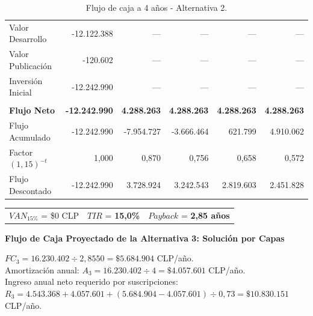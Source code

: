 \begin{table}[h!]
\begin{tabular}{|m{3.2cm}|r|r|r|r|r|}
        & & & & & \\ \hline
        Valor Desarrollo & -12.122.388 & --- & --- & --- & --- \\ \hline
        Valor Publicación & -120.602 & --- & --- & --- & --- \\ \hline
        \rowcolor[HTML]{F3E5F5} 
        Inversión Inicial & -12.242.990 & --- & --- & --- & --- \\ \hline
        & & & & & \\ \hline
        \rowcolor[HTML]{E8F5E9}
        \textbf{Flujo Neto} & \textbf{-12.242.990} & \textbf{4.288.263} & \textbf{4.288.263} & \textbf{4.288.263} & \textbf{4.288.263} \\ \hline
        Flujo Acumulado & -12.242.990 & -7.954.727 & -3.666.464 & 621.799 & 4.910.062 \\ \hline
        \rowcolor[HTML]{F3E5F5}
        Factor $(1{,}15)^{-t}$ & 1,000 & 0,870 & 0,756 & 0,658 & 0,572 \\ \hline
        \rowcolor[HTML]{F3E5F5}
        Flujo Descontado & -12.242.990 & 3.728.924 & 3.242.543 & 2.819.603 & 2.451.828 \\ \hline
    \end{tabular}
    \caption{Flujo de caja a 4 años - Alternativa 2.}
    \label{tab:flujo_alt2}
\end{table}

\begin{center}
\begin{tabular}{lll}
    $VAN_{15\%}$ = \$0 CLP \quad & $TIR$ = \textbf{15,0\%} \quad & $Payback$ = \textbf{2,85 años}
\end{tabular}
\end{center}

\newpage
\textbf{Flujo de Caja Proyectado de la Alternativa 3: Solución por Capas}

$FC_3 = 16.230.402 \div 2{,}8550 = \$5.684.904$ CLP/año.\\
Amortización anual: $A_3 = 16.230.402 \div 4 = \$4.057.601$ CLP/año.\\
Ingreso anual neto requerido por suscripciones:\\ $R_3 = 4.543.368 + 4.057.601 + (5.684.904 - 4.057.601) \div 0{,}73 = \$10.830.151$ CLP/año.

